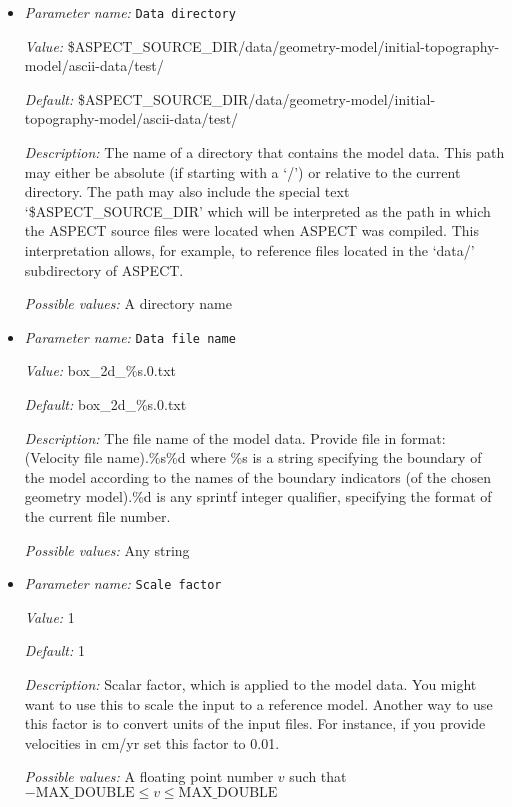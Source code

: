\begin{itemize}
\item {\it Parameter name:} {\tt Data directory}
\label{parameters:Geometry model/Initial topography model/Ascii data model/Data directory}


{\it Value:} \$ASPECT\_SOURCE\_DIR/data/geometry-model/initial-topography-model/ascii-data/test/


{\it Default:} \$ASPECT\_SOURCE\_DIR/data/geometry-model/initial-topography-model/ascii-data/test/


{\it Description:} The name of a directory that contains the model data. This path may either be absolute (if starting with a `/') or relative to the current directory. The path may also include the special text `\$ASPECT\_SOURCE\_DIR' which will be interpreted as the path in which the ASPECT source files were located when ASPECT was compiled. This interpretation allows, for example, to reference files located in the `data/' subdirectory of ASPECT. 


{\it Possible values:} A directory name
\item {\it Parameter name:} {\tt Data file name}
\label{parameters:Geometry model/Initial topography model/Ascii data model/Data file name}


{\it Value:} box\_2d\_\%s.0.txt


{\it Default:} box\_2d\_\%s.0.txt


{\it Description:} The file name of the model data. Provide file in format: (Velocity file name).\%s\%d where \%s is a string specifying the boundary of the model according to the names of the boundary indicators (of the chosen geometry model).\%d is any sprintf integer qualifier, specifying the format of the current file number. 


{\it Possible values:} Any string
\item {\it Parameter name:} {\tt Scale factor}
\label{parameters:Geometry model/Initial topography model/Ascii data model/Scale factor}


{\it Value:} 1


{\it Default:} 1


{\it Description:} Scalar factor, which is applied to the model data. You might want to use this to scale the input to a reference model. Another way to use this factor is to convert units of the input files. For instance, if you provide velocities in cm/yr set this factor to 0.01.


{\it Possible values:} A floating point number $v$ such that $-\text{MAX\_DOUBLE} \leq v \leq \text{MAX\_DOUBLE}$
\end{itemize}

